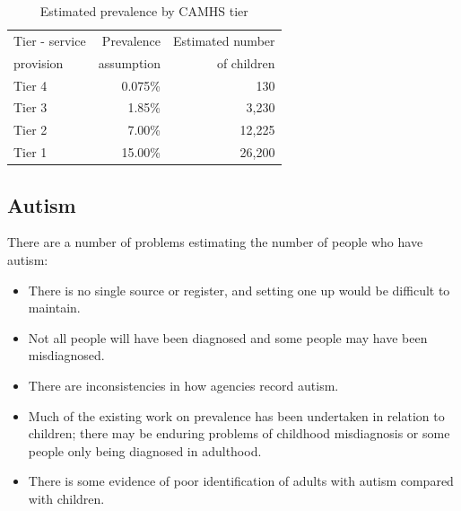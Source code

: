 

\begin{table}[hbt]
    \caption{Estimated prevalence by CAMHS tier}
    \centering
    \begin{tabular}{lrr}
    \toprule
    Tier - service & Prevalence & Estimated number \\
    provision & assumption & of children \\
    \midrule
    Tier 4 & 0.075\% & 130 \\
    Tier 3 & 1.85\% & 3,230 \\
    Tier 2 & 7.00\% & 12,225 \\
    Tier 1 & 15.00\% & 26,200 \\
    \bottomrule
    \end{tabular}
    \label{tab:yp:camhs-tiers}
\end{table}

 
\subsection{Autism}
There are a number of problems estimating the number of people who have autism:
\begin{itemize}[noitemsep]
    \item There is no single source or register, and setting one up would be difficult to maintain.
    \item Not all people will have been diagnosed and some people may have been misdiagnosed.
    \item There are inconsistencies in how agencies record autism.
    \item Much of the existing work on prevalence has been undertaken in relation to children; there may be enduring problems of childhood misdiagnosis or some people only being diagnosed in adulthood.
    \item There is some evidence of poor identification of adults with autism compared with children.
\end{itemize}

